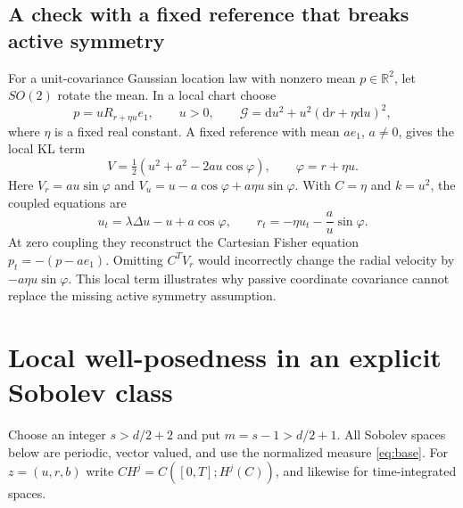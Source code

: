 \documentclass[11pt]{article}
\newcommand{\R}{\mathbb R}
\newcommand{\G}{\mathcal G}
\newcommand{\dd}{\mathrm d}
\begin{document}
\subsection{A check with a fixed reference that breaks active symmetry}

For a unit-covariance Gaussian location law with nonzero mean $p\in\R^2$, let $SO(2)$ rotate the mean. In a local chart choose
\begin{equation}
 p=uR_{r+\eta u}e_1,\qquad u>0,
 \qquad \G=\dd u^2+u^2(\dd r+\eta\dd u)^2,
\end{equation}
where $\eta$ is a fixed real constant. A fixed reference with mean $ae_1$, $a\ne0$, gives the local KL term
\begin{equation}
 V=\tfrac12(u^2+a^2-2au\cos\varphi),\qquad \varphi=r+\eta u.
\end{equation}
Here $V_r=au\sin\varphi$ and
$V_u=u-a\cos\varphi+a\eta u\sin\varphi$.
With $C=\eta$ and $k=u^2$, the coupled equations are
\begin{equation}
 u_t=\lambda\Delta u-u+a\cos\varphi,\qquad
 r_t=-\eta u_t-\frac au\sin\varphi.
 \label{eq:nonbasic}
\end{equation}
At zero coupling they reconstruct the Cartesian Fisher equation $p_t=-(p-ae_1)$. Omitting $C^TV_r$ would incorrectly change the radial velocity by $-a\eta u\sin\varphi$. This local term illustrates why passive coordinate covariance cannot replace the missing active symmetry assumption.

\section{Local well-posedness in an explicit Sobolev class}

Choose an integer $s>d/2+2$ and put $m=s-1>d/2+1$. All Sobolev spaces below are periodic, vector valued, and use the normalized measure \eqref{eq:base}. For $z=(u,r,b)$ write $CH^j=C([0,T];H^j(C))$, and likewise for time-integrated spaces.
\end{document}
